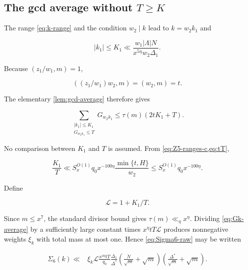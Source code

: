 \subsection{The gcd average without
\texorpdfstring{$T\ge K$}{T >= K}}

The range \cref{eq:k-range} and the condition $w_2\mid k$ lead to
$k=w_2k_1$ and

\begin{equation}\label{eq:K1}
 |k_1|\le K_1\ll
 \frac{w_1|\Lambda|N}{x^{5\eta}w_2\Delta_1}.
\end{equation}

Because $(z_1/w_1,m)=1$,

\begin{equation}\label{eq:linear-gcd-coeff}
 \left((z_1/w_1)w_2,m\right)=(w_2,m)=t.
\end{equation}

The elementary \cref{lem:gcd-average} therefore gives

\begin{equation}\label{eq:Gk-average}
 \sum_{\substack{|k_1|\le K_1\\G_{w_2k_1}\le T}}
 G_{w_2k_1}
 \le \tau(m)(2tK_1+T).
\end{equation}

No comparison between $K_1$ and $T$ is assumed.  From
\cref{eq:Z5-ranges-c,eq:tT},

\begin{equation}\label{eq:K-over-T}
 \frac{K_1}{T}
 \ll S_x^{O(1)}q_0x^{-100\eta}
 \frac{\min\{t,H\}}{w_2}
 \le S_x^{O(1)}q_0x^{-100\eta}.
\end{equation}

Define

\begin{equation}\label{eq:Lloss}
 \mathcal L=1+K_1/T.
\end{equation}

Since $m\le x^7$, the standard divisor bound gives
$\tau(m)\ll_\eta x^\eta$.  Dividing \cref{eq:Gk-average} by a sufficiently
large constant times $x^\eta tT\mathcal L$ produces nonnegative weights
$\xi_k$ with total mass at most one.  Hence \cref{eq:Sigma6-raw} may be
written

\begin{align}
 \Sigma_6(k)\ll{}&\xi_k\mathcal L
 \frac{x^{4\eta}tT}{q_0}
 \frac{\Delta_1}{\Delta^*}
 \left(\frac N{\sqrt m}+\sqrt m\right)
 \left(\frac{\Delta^*}{\sqrt m}+\sqrt m\right).
 \label{eq:Sigma6-normalized}
\end{align}

